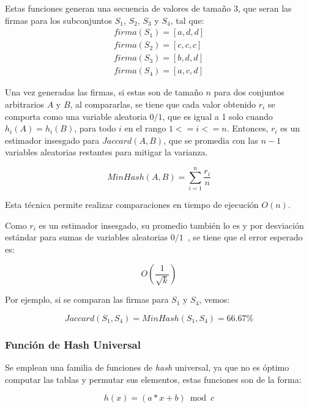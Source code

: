 Estas funciones generan una secuencia de valores de tamaño $3$, 
que seran las firmas para los subconjuntos $S_1$, $S_2$, $S_3$ y $S_4$, tal que:
\begin{align*}
firma(S_1) = [a,d,d] \\
firma(S_2) = [c,c,c] \\
firma(S_3) = [b,d,d] \\
firma(S_4) = [a,c,d]
\end{align*}

Una vez generadas las firmas, si estas son de tamaño $n$ para dos conjuntos arbitrarios $A$ y $B$,
al compararlas, se tiene que cada valor obtenido $r_i$ se comporta como una variable aleatoria $0/1$,
que es igual a 1 solo cuando $h_i(A) = h_i(B)$, para todo $i$ en el rango $1<=i<=n$.
Entonces, $r_i$ es un estimador insesgado para $Jaccard(A, B)$, 
que se promedia con las $n-1$ variables aleatorias restantes para mitigar la varianza.

\begin{equation*}
MinHash(A, B) = \displaystyle\sum_{i=1}^{n} \frac{r_i}{n}
\end{equation*}

Esta técnica permite realizar comparaciones en tiempo de ejecución $O(n)$.

\newpage
Como $r_i$ es un estimador insesgado, su promedio también lo es y
por desviación estándar para sumas de variables aleatorias $0/1$~\cite{coms699812},
se tiene que el error esperado es:

\begin{equation*}
O(\frac{1}{\sqrt{k}})
\end{equation*}

Por ejemplo, si se comparan las firmas para $S_1$ y $S_4$, vemos:

\begin{equation*}
Jaccard(S_1, S_4) = MinHash(S_1, S_4) = 66.67\%
\end{equation*}

\subsubsection{Función de Hash Universal}
Se emplean una familia de funciones de \textit{hash} universal,
ya que no es óptimo computar las tablas y permutar sus elementos,
estas funciones son de la forma:

\begin{equation*}
h(x) = (a * x + b) \bmod c
\end{equation*}

